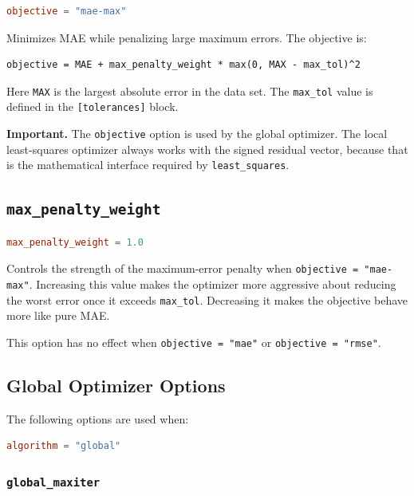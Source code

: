 \documentclass[11pt]{article}
\begin{document}
\begin{lstlisting}[language=toml]
objective = "mae-max"
\end{lstlisting}

Minimizes MAE while penalizing large maximum errors. The objective is:

\begin{lstlisting}
objective = MAE + max_penalty_weight * max(0, MAX - max_tol)^2
\end{lstlisting}

Here \texttt{MAX} is the largest absolute error in the data set. The
\texttt{max\_tol} value is defined in the \texttt{[tolerances]} block.

\textbf{Important.}
The \texttt{objective} option is used by the global optimizer. The local
least-squares optimizer always works with the signed residual vector, because
that is the mathematical interface required by \texttt{least\_squares}.

\subsection{\texttt{max\_penalty\_weight}}

\begin{lstlisting}[language=toml]
max_penalty_weight = 1.0
\end{lstlisting}

Controls the strength of the maximum-error penalty when
\texttt{objective = "mae-max"}. Increasing this value makes the optimizer more
aggressive about reducing the worst error once it exceeds \texttt{max\_tol}.
Decreasing it makes the objective behave more like pure MAE.

This option has no effect when \texttt{objective = "mae"} or
\texttt{objective = "rmse"}.

\subsection{Global Optimizer Options}

The following options are used when:

\begin{lstlisting}[language=toml]
algorithm = "global"
\end{lstlisting}

\subsubsection{\texttt{global\_maxiter}}
\end{document}
